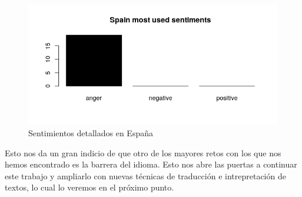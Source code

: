 \begin{figure}[h]
	\centering
	\includegraphics[width=0.7\linewidth]{Imagenes/SpainSentiments}
	\caption{Sentimientos detallados en España}
	\label{fig:SpainSentiments}
\end{figure}

Esto nos da un gran indicio de que otro de los mayores retos con los que nos hemos encontrado es la barrera del idioma. Esto nos abre las puertas a continuar este trabajo y ampliarlo con nuevas técnicas de traducción e intrepretación de textos, lo cual lo veremos en el próximo punto.